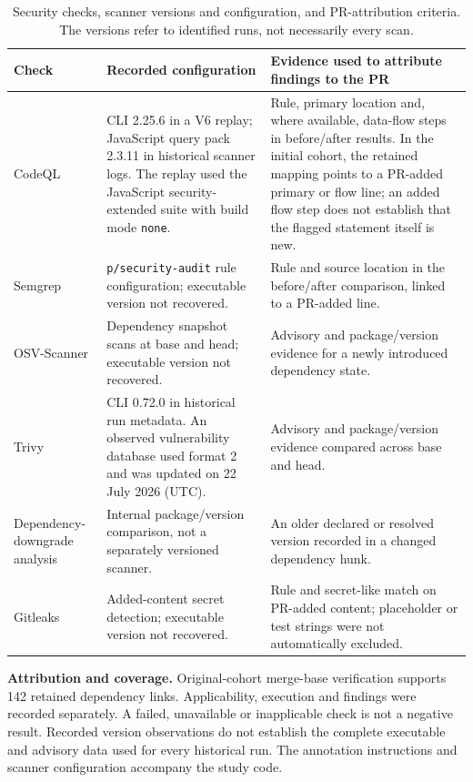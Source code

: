 \begin{table}[H]
\caption{Security checks, scanner versions and configuration, and PR-attribution criteria. The versions refer to identified runs, not necessarily every scan.}
\label{tab:scanners}
\footnotesize\renewcommand{\arraystretch}{1.15}
\begin{tabularx}{\linewidth}{@{}L{1.65cm}L{3.05cm}Y@{}}
\toprule
\textbf{Check} & \textbf{Recorded configuration} & \textbf{Evidence used to attribute findings to the PR}\\
\midrule
CodeQL & CLI 2.25.6 in a V6 replay; JavaScript query pack 2.3.11 in historical scanner logs. The replay used the JavaScript security-extended suite with build mode \texttt{none}. & Rule, primary location and, where available, data-flow steps in before/after results. In the initial cohort, the retained mapping points to a PR-added primary or flow line; an added flow step does not establish that the flagged statement itself is new.\\
Semgrep & \texttt{p/security-audit} rule configuration; executable version not recovered. & Rule and source location in the before/after comparison, linked to a PR-added line.\\
OSV-Scanner & Dependency snapshot scans at base and head; executable version not recovered. & Advisory and package/version evidence for a newly introduced dependency state.\\
Trivy & CLI 0.72.0 in historical run metadata. An observed vulnerability database used format 2 and was updated on 22 July 2026 (UTC). & Advisory and package/version evidence compared across base and head.\\
Dependency-downgrade analysis & Internal package/version comparison, not a separately versioned scanner. & An older declared or resolved version recorded in a changed dependency hunk.\\
Gitleaks & Added-content secret detection; executable version not recovered. & Rule and secret-like match on PR-added content; placeholder or test strings were not automatically excluded.\\
\bottomrule
\end{tabularx}
\par\smallskip\raggedright\scriptsize
\textbf{Attribution and coverage.} Original-cohort merge-base verification supports 142 retained dependency links. Applicability, execution and findings were recorded separately. A failed, unavailable or inapplicable check is not a negative result. Recorded version observations do not establish the complete executable and advisory data used for every historical run. The annotation instructions and scanner configuration accompany the study code.
\end{table}

